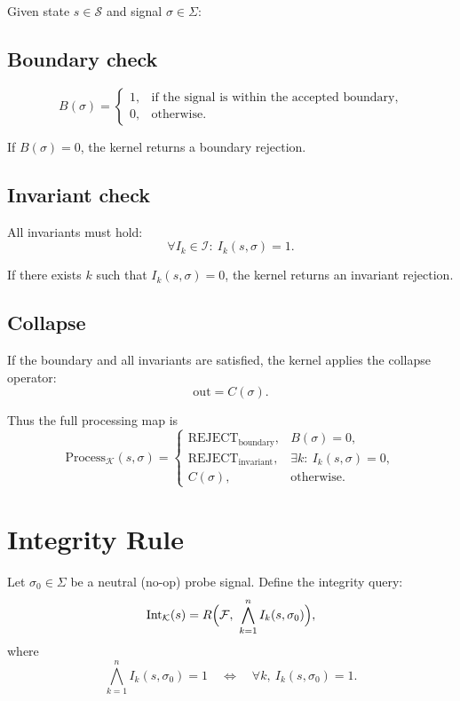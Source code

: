\documentclass[12pt]{article}
\begin{document}
Given state \(s \in \mathcal{S}\) and signal \(\sigma \in \Sigma\):

\subsection*{Boundary check}

\[
B(\sigma) =
\begin{cases}
1, & \text{if the signal is within the accepted boundary},\\
0, & \text{otherwise}.
\end{cases}
\]

If \(B(\sigma) = 0\), the kernel returns a boundary rejection.

\subsection*{Invariant check}

All invariants must hold:
\[
\forall I_k \in \mathcal{I}:\ I_k(s,\sigma) = 1.
\]

If there exists \(k\) such that \(I_k(s,\sigma) = 0\), the kernel returns an invariant rejection.

\subsection*{Collapse}

If the boundary and all invariants are satisfied, the kernel applies the collapse operator:
\[
\text{out} = C(\sigma).
\]

Thus the full processing map is
\[
\text{Process}_{\mathcal{K}}(s,\sigma) =
\begin{cases}
\text{REJECT}_{\text{boundary}}, & B(\sigma) = 0, \\[4pt]
\text{REJECT}_{\text{invariant}}, & \exists k:\ I_k(s,\sigma) = 0, \\[4pt]
C(\sigma), & \text{otherwise}.
\end{cases}
\]

\section*{Integrity Rule}

Let \(\sigma_0 \in \Sigma\) be a neutral (no-op) probe signal.  
Define the integrity query:
\[
\text{Int}_{\mathcal{K}}(s) =
R\Bigl(\mathcal{F},\ \bigwedge_{k=1}^{n} I_k(s,\sigma_0)\Bigr),
\]
where
\[
\bigwedge_{k=1}^{n} I_k(s,\sigma_0) = 1
\quad \Leftrightarrow \quad
\forall k,\ I_k(s,\sigma_0) = 1.
\]
\end{document}
